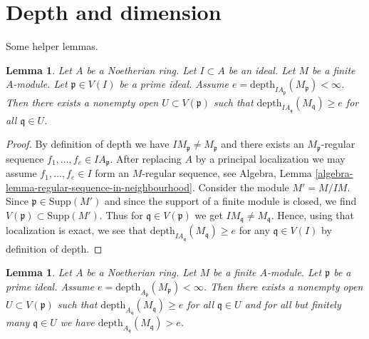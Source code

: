 \documentclass{stacks-project}
\theoremstyle{plain}
\newtheorem{lemma}[subsection]{Lemma}
\theoremstyle{definition}
\theoremstyle{remark}
\numberwithin{equation}{subsection}
\begin{document}
\section{Depth and dimension}
\label{section-dept-dimension}

\noindent
Some helper lemmas.

\begin{lemma}
\label{lemma-ideal-depth-function}
Let $A$ be a Noetherian ring. Let $I \subset A$ be an ideal.
Let $M$ be a finite $A$-module. Let $\mathfrak p \in V(I)$
be a prime ideal. Assume
$e = \text{depth}_{IA_\mathfrak p}(M_\mathfrak p) < \infty$.
Then there exists a nonempty open $U \subset V(\mathfrak p)$
such that $\text{depth}_{IA_\mathfrak q}(M_\mathfrak q) \geq e$
for all $\mathfrak q \in U$.
\end{lemma}

\begin{proof}
By definition of depth we have $IM_\mathfrak p \not = M_\mathfrak p$
and there exists an $M_\mathfrak p$-regular sequence
$f_1, \ldots, f_e \in IA_\mathfrak p$. After replacing $A$ by
a principal localization we may assume $f_1, \ldots, f_e \in I$
form an $M$-regular sequence, see
Algebra, Lemma \ref{algebra-lemma-regular-sequence-in-neighbourhood}.
Consider the module $M' = M/IM$. Since $\mathfrak p \in \text{Supp}(M')$
and since the support of a finite module is closed, we find
$V(\mathfrak p) \subset \text{Supp}(M')$. Thus
for $\mathfrak q \in V(\mathfrak p)$ we get
$IM_\mathfrak q \not = M_\mathfrak q$. Hence, using that
localization is exact, we see that
$\text{depth}_{IA_\mathfrak q}(M_\mathfrak q) \geq e$
for any $\mathfrak q \in V(I)$ by definition of depth.
\end{proof}

\begin{lemma}
\label{lemma-depth-function}
Let $A$ be a Noetherian ring. Let $M$ be a finite $A$-module.
Let $\mathfrak p$ be a prime ideal. Assume
$e = \text{depth}_{A_\mathfrak p}(M_\mathfrak p) < \infty$.
Then there exists a nonempty open $U \subset V(\mathfrak p)$
such that $\text{depth}_{A_\mathfrak q}(M_\mathfrak q) \geq e$
for all $\mathfrak q \in U$ and
for all but finitely many $\mathfrak q \in U$ we have
$\text{depth}_{A_\mathfrak q}(M_\mathfrak q) > e$.
\end{lemma}
\end{document}
